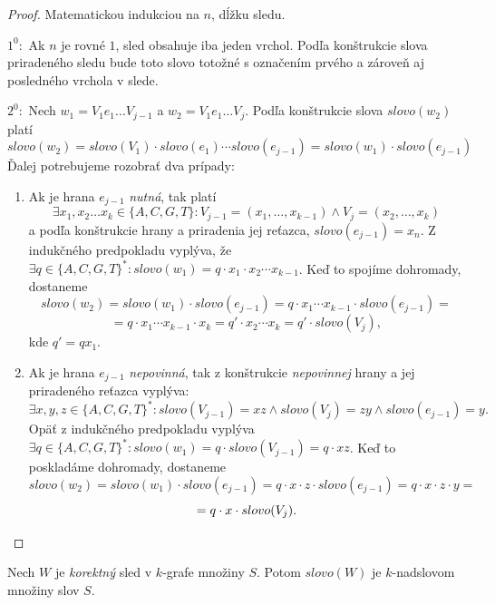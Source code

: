 \begin{proof}
    Matematickou indukciou na $n$, dĺžku sledu.
   
    $1^0:$ Ak $n$ je rovné $1$, sled obsahuje iba jeden vrchol. Podľa konštrukcie slova
           priradeného sledu bude toto slovo totožné s označením prvého a zároveň aj
           posledného vrchola v slede.

    $2^0:$ Nech $w_1 = V_1 e_1 \ldots V_{j-1}$ a $w_2 = V_1 e_1 \ldots V_j$. Podľa konštrukcie slova $slovo(w_2)$ platí
           $$ slovo(w_2) = slovo(V_1) \cdot slovo(e_1) \cdots slovo(e_{j-1}) = slovo(w_1) \cdot slovo(e_{j-1})$$
           Ďalej potrebujeme rozobrať dva prípady:
           \begin{enumerate}
            \item Ak je hrana $e_{j-1}$ \emph{nutná}, tak platí
                  $$ \exists x_1, x_2 \ldots x_k \in \{A, C, G, T \}: V_{j-1} = (x_1, \ldots , x_{k-1}) \wedge V_j = (x_2, \ldots , x_k)$$
                  a podľa konštrukcie hrany a priradenia jej reťazca, $slovo(e_{j-1}) = x_n$.
                  Z indukčného predpokladu vyplýva, že $\exists q \in \{ A, C, G, T\}^*: slovo(w_1) = q \cdot x_1 \cdot x_2 \cdots x_{k-1}$. Keď to
                  spojíme dohromady, dostaneme
                  $$ slovo(w_2) = slovo(w_1) \cdot slovo(e_{j - 1}) = q \cdot x_1 \cdots x_{k - 1} \cdot slovo(e_{j - 1}) = $$
                  $$ = q \cdot x_1 \cdots x_{k - 1} \cdot x_k = q' \cdot x_2 \cdots x_k = q' \cdot slovo(V_j),$$
                  kde $q' = qx_1$.

            \item Ak je hrana $e_{j - 1}$ \emph{nepovinná}, tak z konštrukcie \emph{nepovinnej} hrany a jej priradeného reťazca
                  vyplýva:
                  $$ \exists x, y, z \in \{ A, C, G, T\}^* : slovo(V_{j - 1}) = xz \wedge slovo(V_{j}) = zy \wedge slovo(e_{j - 1}) = y.$$
                  Opäť z indukčného predpokladu vyplýva $ \exists q \in \{A, C, G, T\}^*: slovo(w_1) = q \cdot slovo(V_{j-1}) = q \cdot xz$.
                  Keď to poskladáme dohromady, dostaneme
                  $$ slovo(w_2) = slovo(w_1) \cdot slovo(e_{j - 1}) = q \cdot x \cdot z \cdot slovo(e_{j - 1}) = q \cdot x \cdot z \cdot y = $$
                  $$ = q \cdot x \cdot slovo(V_j).\qedhere$$

           \end{enumerate}
\end{proof}

\begin{veta}
    Nech $W$ je \emph{korektný} sled v $k$-grafe množiny $S$. Potom $slovo(W)$ je $k$-nadslovom množiny slov $S$.
\end{veta}

